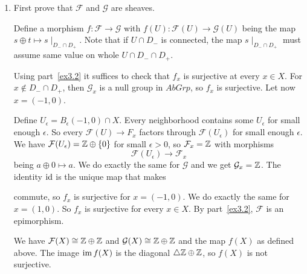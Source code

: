 \begin{exercise}{3}
\begin{enumerate}
{            
            }\label{ex3.2}
        \item{First prove that $\mathcal{F}$ and $\mathcal{G}$ are sheaves.

            Define a morphism $f \colon \mathcal{F} \rightarrow \mathcal{G}$
            with $f(U) \colon \mathcal{F}(U) \rightarrow \mathcal{G}(U)$ being
            the map $s \oplus t \mapsto s \mid_{D_- \cap D_+}$. Note that if $U
            \cap D_-$ is connected, the map $s \mid_{D_- \cap D_+}$ must assume
            same value on whole $U \cap D_- \cap D_+$.

            Using part~\ref{ex3.2} it suffices to check that $f_x$ is surjective
            at every $x \in X$. For $x \notin D_- \cap D_+$, then
            $\mathcal{G}_x$ is a null group in $AbGrp$, so $f_x$ is surjective.
            Let now $x = (-1, 0)$.

            Define $U_\epsilon = B_\epsilon(-1, 0) \cap X$. Every neighborhood
            contains some $U_\epsilon$ for small enough $\epsilon$. So every
            $\mathcal{F}(U) \rightarrow F_x$ factors through
            $\mathcal{F}(U_\epsilon)$ for small enough $\epsilon$. We have
            $\mathcal{F}(U_\epsilon) = \mathbb{Z} \oplus \{0\}$ for small $\epsilon >
            0$, so $\mathcal{F}_x = \mathbb{Z}$ with morphisms
            \begin{equation*}
                \mathcal{F}(U_\epsilon) \rightarrow \mathcal{F}_x
            \end{equation*}
            being $a \oplus 0 \mapsto a$. We do exactly the same for
            $\mathcal{G}$ and we get $\mathcal{G}_x = \mathbb{Z}$. The identity $\operatorname{id}$ is
            the unique map that makes


            commute, so $f_x$ is surjective for $x = (-1, 0)$. We do exactly the
            same for $x = (1, 0)$. So $f_x$ is surjective for every $x \in X$. By
            part~\ref{ex3.2}, $\mathcal{F}$ is an epimorphism.

            We have $\mathcal{F}(X) \cong \mathbb{Z} \oplus \mathbb{Z}$ and $\mathcal{G}(X)
            \cong \mathbb{Z} \oplus \mathbb{Z}$ and the map $f(X)$ as defined above. The image
            $\operatorname{im} f(X)$ is the diagonal $\triangle \mathbb{Z} \oplus \mathbb{Z}$, so $f(X)$ is
            not surjective.
            }
    \end{enumerate}
\end{exercise}


